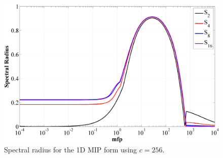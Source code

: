 \begin{figure}
\centering
\includegraphics[width=\textwidth]{figures/appendices/DSA_1D_SI_MIP_C=256.png}
\caption{Spectral radius for the 1D MIP form using $c=256$.}
\label{fig::1D_MIP_c=256}
\end{figure}



